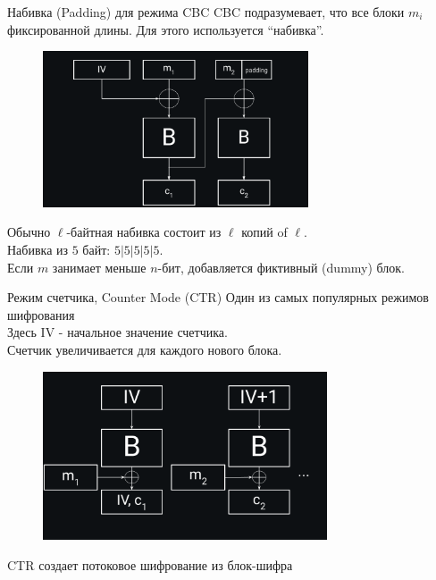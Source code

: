 \documentclass[usenames,dvipsnames,8pt,aspectratio=169]{beamer}
\begin{document}
\begin{frame}{Набивка (Padding) для режима CBC}
\Large
CBC подразумевает, что все блоки $m_i$ фиксированной длины. Для этого используется ``набивка''.
\begin{figure}
\includegraphics[width=0.70\textwidth]{CBC_Padding}
\end{figure}
Обычно $\ell$-байтная набивка состоит из $\ell$ копий of $\ell$. \\
Набивка из $5$ байт: $5|5|5|5|5$. \\
Если $m$ занимает меньше $n$-бит, добавляется фиктивный (dummy) блок.
\end{frame}

\begin{frame}{Режим счетчика, Counter Mode (CTR)}
\Large
Один из самых популярных режимов шифрования \\
Здесь IV - начальное значение счетчика. \\
Счетчик увеличивается для каждого нового блока. \\
\begin{figure}
\includegraphics[width=0.75\textwidth]{CTR}
\end{figure}
\vspace{-20pt}
CTR создает потоковое шифрование из блок-шифра \\

\end{frame}
\end{document}
